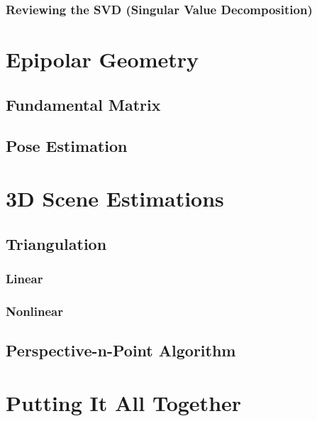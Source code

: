 \documentclass{book}
\begin{document}
            \subsection{Reviewing the SVD (Singular Value Decomposition)}

    \chapter{Epipolar Geometry} 
        \section{Fundamental Matrix}

        \section{Pose Estimation}

    \chapter{3D Scene Estimations}
        \section{Triangulation}
            \subsection{Linear}
            \subsection{Nonlinear}

        \section{Perspective-n-Point Algorithm}

    \chapter{Putting It All Together}
\end{document}
